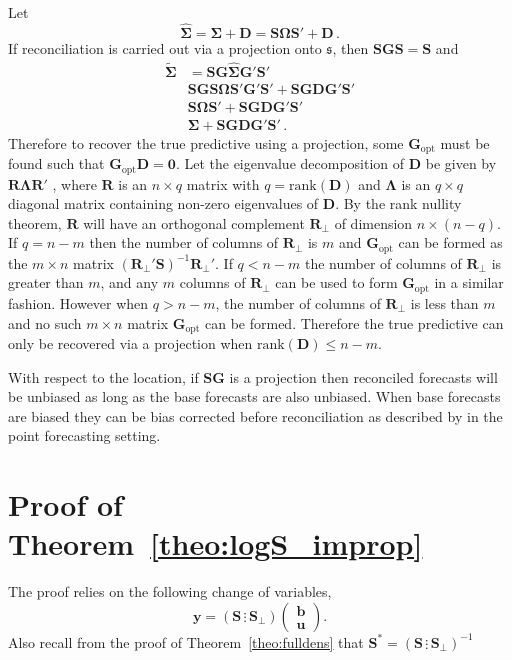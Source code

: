 \documentclass[11pt]{article}
\theoremstyle{definition}
\begin{document}
Let
\[
\hat{\bm{\Sigma}}=\bm{\Sigma}+\bm{D}=\bm{S}\bm{\Omega}{\bm{S}}'+\bm{D}\,.
\]
If reconciliation is carried out via a projection onto $\mathfrak{s}$, then $\bm{S}\bm{G}\bm{S}=\bm{S}$ and
\begin{align}
\tilde{\bm{\Sigma}}&=\bm{S}\bm{G}\hat{\bm{\Sigma}}\bm{G}'\bm{S}'\nonumber\\
&\bm{S}\bm{G}\bm{S}\bm{\Omega}\bm{S}'\bm{G}'{\bm{S}}'+\bm{S}\bm{G}\bm{D}\bm{G}'\bm{S}'\nonumber\\
&\bm{S}\bm{\Omega}{\bm{S}}'+\bm{S}\bm{G}\bm{D}\bm{G}'\bm{S}'\nonumber\\
&\bm{\Sigma}+\bm{S}\bm{G}\bm{D}\bm{G}'\bm{S}'\nonumber\,.
\end{align}
Therefore to recover the true predictive using a projection, some $\bm{G}_{\text{opt}}$ must be found such that $\bm{G}_{\text{opt}}\bm{D}=\bm{0}$. Let the eigenvalue decomposition of $\bm{D}$ be given by $\bm{R}\bm{\Lambda}\bm{R}'$ , where $\bm{R}$ is an $n\times q$ matrix with $q=\textrm{rank}({\bm{D}})$ and ${\bm\Lambda}$ is an $q\times q$ diagonal matrix containing non-zero eigenvalues of $\bm{D}$. By the rank nullity theorem, $\bm{R}$ will have an orthogonal complement $\bm{R}_{\perp}$ of dimension $n\times (n-q)$. If $q=n-m$ then the number of columns of $\bm{R}_{\perp}$ is $m$ and $\bm{G}_{\text{opt}}$ can be formed as the $m\times n$ matrix $(\bm{R}_{\perp}'\bm{S})^{-1}\bm{R}_{\perp}'$. If $q<n-m$ the number of columns of $\bm{R}_{\perp}$ is greater than $m$, and any $m$ columns of $\bm{R}_{\perp}$ can be used to form $\bm{G}_{\text{opt}}$ in a similar fashion. However when $q>n-m$, the number of columns of $\bm{R}_{\perp}$ is less than $m$ and no such $m\times n$ matrix $\bm{G}_{\text{opt}}$ can be formed. Therefore the true predictive can only be recovered via a projection when $\textrm{rank}(\bm{D})\leq n-m$.

With respect to the location, if $\bm{S}\bm{G}$ is a projection then reconciled forecasts will be unbiased as long as the base forecasts are also unbiased. When base forecasts are biased they can be bias corrected before reconciliation as described by \cite{PanEtAl2020_Geometry} in the point forecasting setting.

\clearpage
\section{Proof of Theorem~\ref{theo:logS_improp}}\label{app:logS_improp}

The proof relies on the following change of variables,
\[
\bm{y}=\left(\bm{S}\,\vdots\,\bm{S}_\perp\right)\begin{pmatrix}\bm{b}\\\bm{u}\end{pmatrix}.
\]
Also recall from the proof of Theorem~\ref{theo:fulldens} that $\bm{S}^*=\left(\bm{S}\,\vdots\,\bm{S}_\perp\right)^{-1}$
\end{document}
